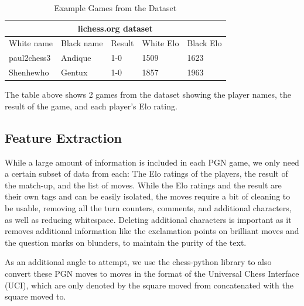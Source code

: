 \documentclass[conference]{IEEEtran}
\begin{document}
\begin{table}[htbp]
\vspace{.01cm}
\caption{Example Games from the Dataset}
\begin{center}
\begin{tabular}{|lllll|}
\hline
\multicolumn{5}{|c|}{lichess.org dataset}                                                                                                      \\ \hline
\multicolumn{1}{|l|}{White name}  & \multicolumn{1}{l|}{Black name} & \multicolumn{1}{l|}{Result} & \multicolumn{1}{l|}{White Elo} & Black Elo \\ \hline
\multicolumn{1}{|l|}{paul2chess3} & \multicolumn{1}{l|}{Andique}    & \multicolumn{1}{l|}{1-0}    & \multicolumn{1}{l|}{1509}      & 1623      \\ \hline
\multicolumn{1}{|l|}{Shenhewho}   & \multicolumn{1}{l|}{Gentux}     & \multicolumn{1}{l|}{1-0}    & \multicolumn{1}{l|}{1857}      & 1963      \\ \hline
\end{tabular}
\begin{minipage}{8cm}
    \vspace{0.1cm}
    \small The table above shows 2 games from the dataset showing the player names, the result of the game, and each player's Elo rating.
\end{minipage}
\end{center}
\label{example-games}
\end{table}

\subsection{Feature Extraction}

While a large amount of information is included in each PGN game, we only need a certain subset of data from each: The Elo ratings of the players, the result of the match-up, and the list of moves. While the Elo ratings and the result are their own tags and can be easily isolated, the moves require a bit of cleaning to be usable, removing all the turn counters, comments, and additional characters, as well as reducing whitespace. Deleting additional characters is important as it removes additional information like the exclamation points on brilliant moves and the question marks on blunders, to maintain the purity of the text.

As an additional angle to attempt, we use the chess-python library to also convert these PGN moves to moves in the format of the Universal Chess Interface (UCI), which are only denoted by the square moved from concatenated with the square moved to.
\end{document}
